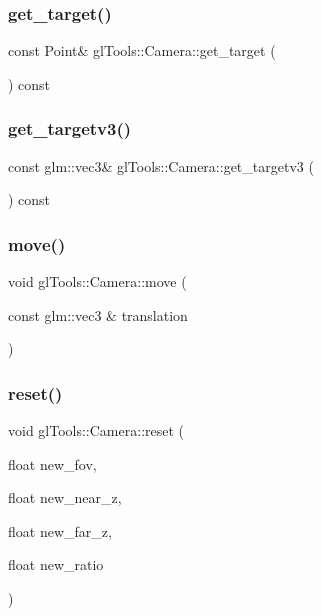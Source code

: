 \mbox{\label{classgl_tools_1_1_camera_a97f9583a6d28b93dd10d30bd24676543}} 
\subsubsection{get\_target()}
{\footnotesize\ttfamily const Point\& gl\+Tools\+::\+Camera\+::get\+\_\+target (\begin{DoxyParamCaption}{ }\end{DoxyParamCaption}) const\hspace{0.3cm}{\ttfamily [inline]}}

\mbox{\label{classgl_tools_1_1_camera_aa301c4d3a47208fc889180ed63d8d37d}} 
\subsubsection{get\_targetv3()}
{\footnotesize\ttfamily const glm\+::vec3\& gl\+Tools\+::\+Camera\+::get\+\_\+targetv3 (\begin{DoxyParamCaption}{ }\end{DoxyParamCaption}) const\hspace{0.3cm}{\ttfamily [inline]}}

\mbox{\label{classgl_tools_1_1_camera_a5a9d3eb54ff5c8c0a8a9dda69fc8cb0a}} 
\subsubsection{move()}
{\footnotesize\ttfamily void gl\+Tools\+::\+Camera\+::move (\begin{DoxyParamCaption}\item[{const glm\+::vec3 \&}]{translation }\end{DoxyParamCaption})\hspace{0.3cm}{\ttfamily [inline]}}

\mbox{\label{classgl_tools_1_1_camera_a392615b968aaba5de76602b5cce7ea57}} 
\subsubsection{reset()}
{\footnotesize\ttfamily void gl\+Tools\+::\+Camera\+::reset (\begin{DoxyParamCaption}\item[{float}]{new\+\_\+fov,  }\item[{float}]{new\+\_\+near\+\_\+z,  }\item[{float}]{new\+\_\+far\+\_\+z,  }\item[{float}]{new\+\_\+ratio }\end{DoxyParamCaption})\hspace{0.3cm}{\ttfamily [inline]}}

